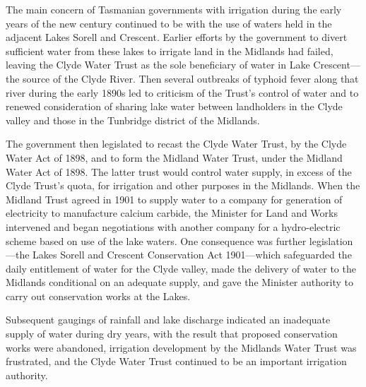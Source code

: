 The main concern of Tasmanian governments with irrigation during the
early years of the new century continued to be with the use of waters
held in the adjacent Lakes Sorell and Crescent.  Earlier efforts by
the government to divert sufficient water from these lakes to irrigate
land in the Midlands had failed, leaving the Clyde Water Trust as the
sole beneficiary of water in Lake Crescent---the source of the Clyde
River.  Then several outbreaks of typhoid fever along that river
during the early 1890s led to criticism of the Trust's control of
water and to renewed consideration of sharing lake water between
landholders in the Clyde valley and those in the Tunbridge district of
the Midlands.

The government then legislated to recast the Clyde Water Trust, by the
Clyde Water Act of 1898, and to form the Midland Water Trust, under
the Midland Water Act of 1898.  The latter trust would control water
supply, in excess of the Clyde Trust's quota, for irrigation and other
purposes in the Midlands.  When the Midland Trust agreed in 1901 to
supply water to a company for generation of electricity to manufacture
calcium carbide, the Minister for Land and Works intervened and began
negotiations with another company for a hydro-electric scheme based on
use of the lake waters.  One consequence was further legislation---the
Lakes Sorell and Crescent Conservation Act 1901---which safeguarded
the daily entitlement of water for the Clyde valley, made the delivery
of water to the Midlands conditional on an adequate supply, and gave
the Minister authority to carry out conservation works at the
Lakes.

Subsequent gaugings of rainfall and lake discharge indicated an
inadequate supply of water during dry years, with the result that
proposed conservation works were abandoned, irrigation development by
the Midlands Water Trust was frustrated, and the Clyde Water Trust
continued to be an important irrigation authority.

